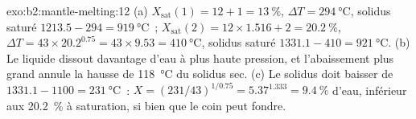 \begin{solution}{exo:b2:mantle-melting:12}
(a) $X_{\mathrm{sat}}(1) = 12 + 1 = \qty{13}{\percent}$, $\Delta T =
\qty{294}{\celsius}$, solidus saturé $1213.5 - 294 = \qty{919}{\celsius}$~;
$X_{\mathrm{sat}}(2) = 12\times1.516 + 2 = \qty{20.2}{\percent}$, $\Delta T =
43\times20.2^{0.75} = 43\times9.53 = \qty{410}{\celsius}$, solidus saturé $1331.1
- 410 = \qty{921}{\celsius}$. (b) Le liquide dissout davantage d'eau à plus haute pression,
et l'abaissement plus grand annule la hausse de \qty{118}{\celsius} du solidus sec. (c) Le solidus doit
baisser de $1331.1 - 1100 = \qty{231}{\celsius}$~: $X =
(231/43)^{1/0.75} = 5.37^{1.333} = \qty{9.4}{\percent}$ d'eau, inférieur aux
\qty{20.2}{\percent} à saturation, si bien que le coin peut fondre.
\end{solution}


